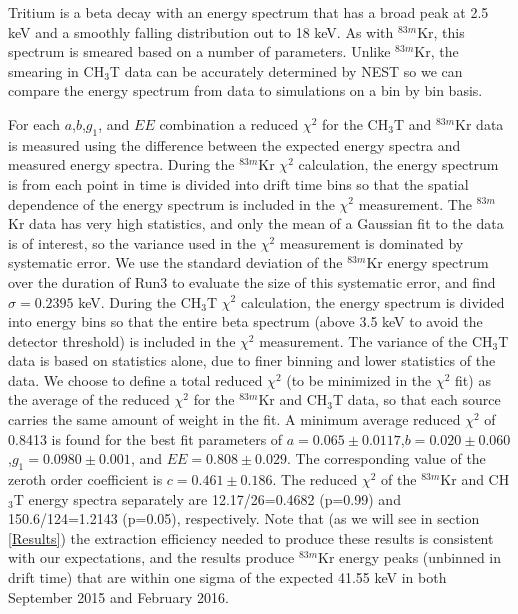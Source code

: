 Tritium is a beta decay with an energy spectrum that has a broad peak at 2.5 keV and a smoothly falling distribution out to 18 keV.  As with $^{83m}$Kr, this spectrum is smeared based on a number of parameters.  Unlike $^{83m}$Kr, the smearing in CH$_3$T data can be accurately determined by NEST so we can compare the energy spectrum from data to simulations on a bin by bin basis. 

For each $a$,$b$,$g_1$, and $EE$ combination a reduced $\chi^2$ for the CH$_3$T and $^{83m}$Kr data is measured using the difference between the expected energy spectra and measured energy spectra.   During the $^{83m}$Kr $\chi^2$ calculation, the energy spectrum is from each point in time is divided into drift time bins so that the spatial dependence of the energy spectrum is included in the $\chi^2$ measurement.  The $^{83m}$Kr data has very high statistics, and only the mean of a Gaussian fit to the data is of interest, so the variance used in the $\chi^2$  measurement  is dominated by systematic error.  We use the standard deviation of the $^{83m}$Kr energy spectrum over the duration of Run3 to evaluate the size of this systematic error, and find $\sigma = 0.2395$ keV.  During the CH$_3$T $\chi^2$  calculation, the energy spectrum is divided into energy bins so that the entire beta spectrum (above 3.5 keV to avoid the detector threshold) is included in the $\chi^2$ measurement.  The variance of the CH$_3$T data is based on statistics alone, due to finer binning and lower statistics of the data.  We choose to define a total reduced $\chi^2$ (to be minimized in the $\chi^2$ fit) as the average of the reduced $\chi^2$ for the $^{83m}$Kr and CH$_3$T data, so that each source carries the same amount of weight in the fit. A minimum average reduced  $\chi^2$ of 0.8413 is found for the best fit parameters of $a=0.065 \pm 0.0117$,$b=0.020 \pm 0.060$,$g_1=0.0980 \pm 0.001$, and $EE=0.808 \pm 0.029$. The corresponding value of the zeroth order coefficient is $c=0.461 \pm 0.186$.  The reduced $\chi^2$ of the $^{83m}$Kr and CH$_3$T energy spectra separately are 12.17/26=0.4682 (p=0.99) and 150.6/124=1.2143 (p=0.05), respectively. Note that (as we will see in section \ref{Results}) the extraction efficiency needed to produce these results is consistent with our expectations, and the results produce $^{83m}$Kr energy peaks (unbinned in drift time) that are within one sigma of the expected 41.55 keV in both September 2015 and February 2016. 


